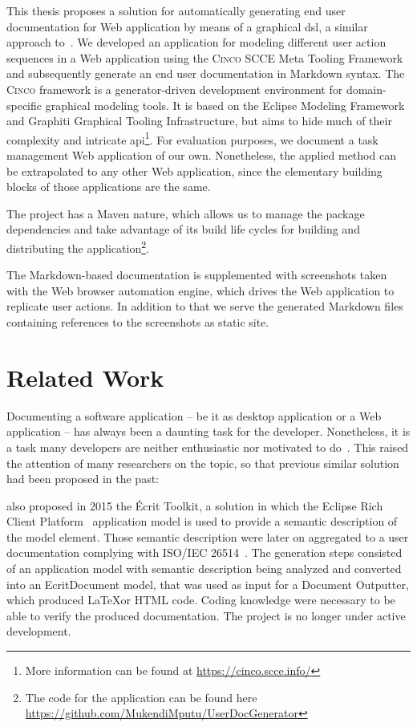 This thesis proposes a solution for automatically generating end user documentation for Web application by means of a graphical \gls*{dsl}, a similar approach to~\cite{bosselmann-et_al}. We developed an application for modeling different user action sequences in a Web application using the \textsc{Cinco} SCCE Meta Tooling Framework~\cite{Cinco} and subsequently generate an end user documentation in Markdown syntax. The \textsc{Cinco} framework is a generator-driven development environment for domain-specific graphical modeling tools. It is based on the Eclipse Modeling Framework and Graphiti Graphical Tooling Infrastructure, but aims to hide much of their complexity and intricate \gls{api}\footnote{More information can be found at \url{https://cinco.scce.info/}}. For evaluation purposes, we document a task management Web application of our own. Nonetheless, the applied method can be extrapolated to any other Web application, since the elementary building blocks of those applications are the same.

The project has a Maven nature, which allows us to manage the package dependencies and take advantage of its build life cycles for building and distributing the application\footnote{The code for the application can be found here \url{https://github.com/MukendiMputu/UserDocGenerator}}.

The Markdown-based documentation is supplemented with screenshots taken with the Web browser automation engine, which drives the Web application to replicate user actions. In addition to that we serve the generated Markdown files containing references to the screenshots as static site.

\section{Related Work}\label{sec:relWork}

Documenting a software application -- be it as desktop application or a Web application -- has always been a daunting task for the developer. Nonetheless, it is a task many developers are neither enthusiastic nor motivated to do~\cite{kipyegen2013importance}. This raised the attention of many researchers on the topic, so that previous similar solution had been proposed in the past:

\cite{descher_et-al} also proposed in 2015 the Écrit Toolkit, a solution in which the Eclipse Rich Client Platform~\cite{eclipseRCP} application model is used to provide a semantic description of the model element. Those semantic description were later on aggregated to a user documentation complying with ISO/IEC 26514~\cite{descher_et-al}. The generation steps consisted of an application model with semantic description being analyzed and converted into an EcritDocument model, that was used as input for a Document Outputter, which produced \LaTeX or HTML code. Coding knowledge were necessary to be able to verify the produced documentation. The project is no longer under active development.

